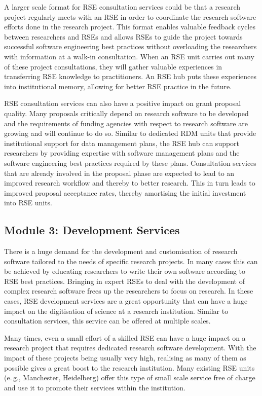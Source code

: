 \documentclass[a4paper]{article}
\newcommand*{\eg}{e.\,g.,\xspace}
\begin{document}
A larger scale format for RSE consultation services could be that a research project regularly meets with an RSE in order to coordinate the research software efforts done in the research project.
This format enables valuable feedback cycles between researchers and RSEs and allows RSEs to guide the project towards successful software engineering best practices without overloading the researchers with information at a walk-in consultation.
When an RSE unit carries out many of these project consultations, they will gather valuable experiences in transferring RSE knowledge to practitioners.
An RSE hub puts these experiences into institutional memory, allowing for better RSE practice in the future.

RSE consultation services can also have a positive impact on grant proposal quality.
Many proposals critically depend on research software to be developed and the requirements of funding agencies with respect to research software are growing and will continue to do so.
Similar to dedicated RDM units that provide institutional support for data management plans, the RSE hub can support researchers by providing expertise with software management plans and the software engineering best practices required by these plans.
Consultation services that are already involved in the proposal phase are expected to lead to an improved research workflow and thereby to better research.
This in turn leads to improved proposal acceptance rates, thereby amortising the initial investment into RSE units.


\subsection{Module 3: Development Services}%
\label{sec:development}

There is a huge demand for the development and customisation of research software tailored to the needs of specific research projects.
In many cases this can be achieved by educating researchers to write their own software according to RSE best practices.
Bringing in expert RSEs to deal with the development of complex research software frees up the researchers to focus on research.
In these cases, RSE development services are a great opportunity that can have a huge impact on the digitisation of science at a research institution.
Similar to consultation services, this service can be offered at multiple scales.

Many times, even a small effort of a skilled RSE can have a huge impact on a research project that requires dedicated research software development.
With the impact of these projects being usually very high, realising as many of them as possible gives a great boost to the research institution.
Many existing RSE units (\eg{} Manchester, Heidelberg) offer this type of small scale service free of charge and use it to promote their services within the institution.
\end{document}
